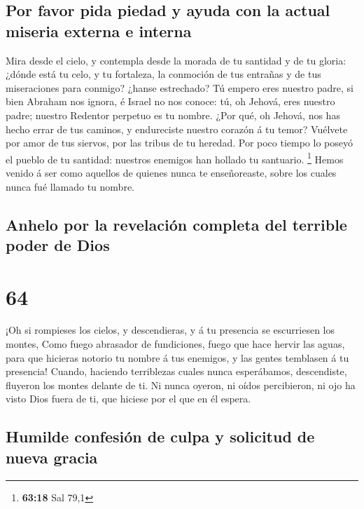 \hypertarget{por-favor-pida-piedad-y-ayuda-con-la-actual-miseria-externa-e-interna}{%
\subsection{Por favor pida piedad y ayuda con la actual miseria externa
e
interna}\label{por-favor-pida-piedad-y-ayuda-con-la-actual-miseria-externa-e-interna}}

 Mira desde el cielo, y contempla desde la morada de tu
santidad y de tu gloria: ¿dónde está tu celo, y tu fortaleza, la
conmoción de tus entrañas y de tus miseraciones para conmigo? ¿hanse
estrechado?  Tú empero eres nuestro padre, si bien
Abraham nos ignora, é Israel no nos conoce: tú, oh Jehová, eres nuestro
padre; nuestro Redentor perpetuo es tu nombre.  ¿Por qué,
oh Jehová, nos has hecho errar de tus caminos, y endureciste nuestro
corazón á tu temor? Vuélvete por amor de tus siervos, por las tribus de
tu heredad.  Por poco tiempo lo poseyó el pueblo de tu
santidad: nuestros enemigos han hollado tu santuario. \footnote{\textbf{63:18}
  Sal 79,1}  Hemos venido á ser como aquellos de quienes
nunca te enseñoreaste, sobre los cuales nunca fué llamado tu nombre.

\hypertarget{anhelo-por-la-revelaciuxf3n-completa-del-terrible-poder-de-dios}{%
\subsection{Anhelo por la revelación completa del terrible poder de
Dios}\label{anhelo-por-la-revelaciuxf3n-completa-del-terrible-poder-de-dios}}

\hypertarget{section-63}{%
\section{64}\label{section-63}}

 ¡Oh si rompieses los cielos, y descendieras, y á tu
presencia se escurriesen los montes,  Como fuego abrasador
de fundiciones, fuego que hace hervir las aguas, para que hicieras
notorio tu nombre á tus enemigos, y las gentes temblasen á tu presencia!
 Cuando, haciendo terriblezas cuales nunca esperábamos,
descendiste, fluyeron los montes delante de ti.  Ni nunca
oyeron, ni oídos percibieron, ni ojo ha visto Dios fuera de ti, que
hiciese por el que en él espera.

\hypertarget{humilde-confesiuxf3n-de-culpa-y-solicitud-de-nueva-gracia}{%
\subsection{Humilde confesión de culpa y solicitud de nueva
gracia}\label{humilde-confesiuxf3n-de-culpa-y-solicitud-de-nueva-gracia}}

